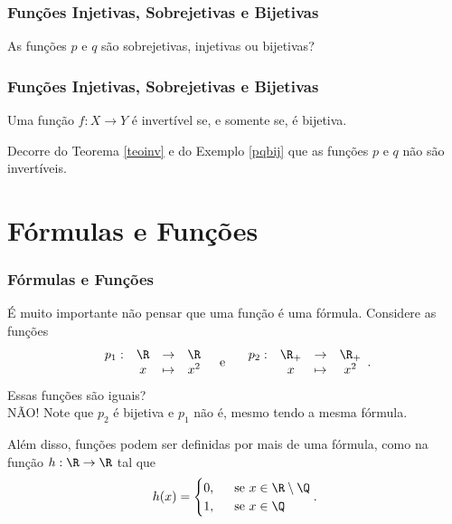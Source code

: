 \documentclass[10pt]{beamer}
\begin{document}

\begin{frame}
\frametitle{Funções Injetivas, Sobrejetivas e Bijetivas} 

\begin{exemplo}\label{pqbij}
As funções $p$ e $q$ são sobrejetivas, injetivas ou bijetivas?
\end{exemplo}
\end{frame}




\begin{frame}
\frametitle{Funções Injetivas, Sobrejetivas e Bijetivas} 

\begin{teorema}\label{teoinv}
Uma função $f: X \to Y$ é invertível se, e somente se, é bijetiva.
\end{teorema}\pause

\begin{exemplo}
Decorre do Teorema \ref{teoinv} e do Exemplo \ref{pqbij} que as
funções $p$ e $q$ não são invertíveis.
\end{exemplo}

\end{frame}



\section{Fórmulas e Funções}
\begin{frame}
\frametitle{Fórmulas e Funções} 
É muito importante não pensar que uma função é uma fórmula.
Considere as funções
$$\begin{array}{cccc}
p_1 : & \R & \to     & \R \\
		 &  x & \mapsto & x^2
\end{array}
\text{\ \ \  e \ \ \ }
\begin{array}{cccc}
p_2 : & \R_+ & \to     & \R_+ \\
		 &  x & \mapsto &  x^2
\end{array}.$$
Essas funções são iguais? \\ \pause NÃO! Note que $p_2$ é bijetiva e
$p_1$ não é, mesmo tendo a mesma fórmula.

Além disso, funções podem ser definidas por mais de uma fórmula,
como na função $h :  \R  \to      \R$ tal que
		 $$h(x) =  \begin{cases}
						0, &  \ \text{ se } x \in \R \setminus \Q \\
						1, & \ \text{ se } x \in \Q
						\end{cases} .$$
\end{frame}
\end{document}
